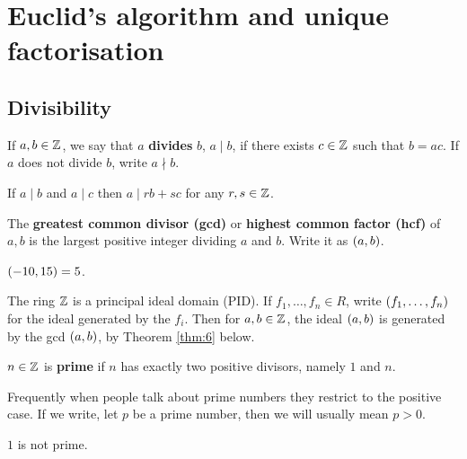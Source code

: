 \pagebreak

\section{Euclid's algorithm and unique factorisation}

\subsection{Divisibility}

\begin{definition}
If $ a, b \in \mathbb{Z} $, we say that $ a $ \textbf{divides} $ b $, $ a \mid b $, if there exists $ c \in \mathbb{Z} $ such that $ b = ac $. If $ a $ does not divide $ b $, write $ a \nmid b $.
\end{definition}

If $ a \mid b $ and $ a \mid c $ then $ a \mid rb + sc $ for any $ r, s \in \mathbb{Z} $.

\begin{definition}
The \textbf{greatest common divisor (gcd)} or \textbf{highest common factor (hcf)} of $ a, b $ is the largest positive integer dividing $ a $ and $ b $. Write it as $ \left( a, b \right) $.
\end{definition}

\begin{example2}
$ \left( -10, 15 \right) = 5 $.
\end{example2}

\begin{note}
The ring $ \mathbb{Z} $ is a principal ideal domain (PID). If $ f_1, \dots, f_n \in R $, write $ \left( f_1, \dots, f_n \right) $ for the ideal generated by the $ f_i $. Then for $ a, b \in \mathbb{Z} $, the ideal $ \left( a, b \right) $ is generated by the gcd $ \left( a, b \right) $, by Theorem \ref{thm:6} below.
\end{note}

\begin{definition}
$ n \in \mathbb{Z} $ is \textbf{prime} if $ n $ has exactly two positive divisors, namely $ 1 $ and $ n $.
\end{definition}

\begin{note}
Frequently when people talk about prime numbers they restrict to the positive case. If we write, let $ p $ be a prime number, then we will usually mean $ p > 0 $.
\end{note}

\begin{note}
$ 1 $ is not prime.
\end{note}


